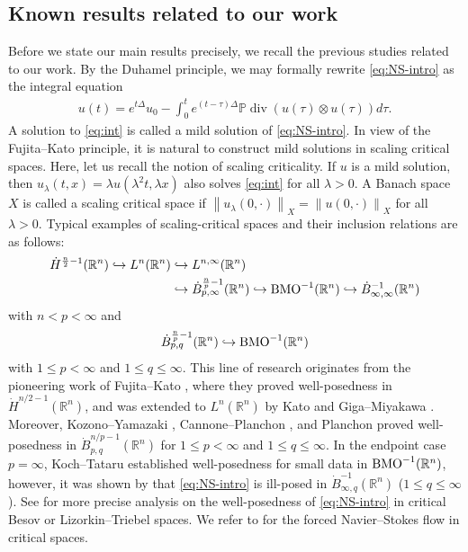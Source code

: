 \documentclass[a4paper,12pt,reqno]{amsart}
\theoremstyle{plain}
\theoremstyle{definition}
\renewcommand{\div}{\operatorname{div}}
\newcommand{\dB}{\dot{B}}
\renewcommand{\leq}{\leqslant}
\newcommand{\n}[1]{{\left\|#1\right\|}}
\newcommand{\R}{\mathbb{R}}
\begin{document}
\subsection{Known results related to our work}
Before we state our main results precisely, we recall the previous studies related to our work.
By the Duhamel principle, we may formally rewrite
\eqref{eq:NS-intro} as the integral equation
\begin{align}\label{eq:int}
    u(t)
    = 
    e^{t\Delta}u_0
    -
    \int_0^t 
    e^{(t-\tau)\Delta}
    \mathbb{P}\div(u(\tau)\otimes u(\tau))d\tau.
\end{align}
A solution to \eqref{eq:int} is called a mild solution of \eqref{eq:NS-intro}.
In view of the Fujita--Kato principle, 
it is natural to construct mild solutions in scaling critical spaces.
Here, let us recall the notion of scaling criticality. 
If $u$ is a mild solution, then  $u_\lambda(t,x)=\lambda u(\lambda^2 t,\lambda x)$
also solves \eqref{eq:int} for all $\lambda>0$. 
A Banach space $X$
is called a scaling critical space if $\n{u_{\lambda}(0,\cdot)}_X = \n{u(0,\cdot)}_X$ for all $\lambda>0$. 
Typical examples of scaling-critical spaces and their inclusion relations are as follows:
\begin{align}
    \dot{H}^{\frac{n}{2}-1}(\mathbb{R}^n)
    \hookrightarrow 
    L^n(\mathbb{R}^n)
    &
    \hookrightarrow 
    L^{n,\infty}(\mathbb{R}^n)
    \\
    &
    \hookrightarrow
    \dot{B}_{p,\infty}^{\frac{n}{p}-1}(\R^n)
    \hookrightarrow
    {\rm BMO}^{-1}(\R^n)
    \hookrightarrow
    \dB_{\infty,\infty}^{-1}(\R^n)
\end{align}
with $n<p<\infty$ and 
\begin{align}
    \dot{B}_{p,q}^{\frac{n}{p}-1}(\mathbb{R}^n)\hookrightarrow {\rm BMO}^{-1}(\mathbb{R}^n)
\end{align}
with $1\leq p<\infty$ and $1\leq q\leq\infty$.
This line of research originates from the pioneering work of Fujita--Kato \cite{Fuj-Kato-64-ARMA}, where they proved well-posedness
in $\dot{H}^{n/2-1}(\mathbb{R}^n)$, and was extended to $L^n(\mathbb{R}^n)$ by Kato \cite{Kato-84}
and Giga--Miyakawa \cite{Gig-Miy-85}.
Moreover, Kozono--Yamazaki \cite{Koz-Yam-94}, Cannone--Planchon \cite{Can-Pla-96}, and Planchon \cite{Pla-98}
proved well-posedness in
$\dot{B}_{p,q}^{n/p-1}(\mathbb{R}^n)$ for $1\leq p<\infty$ and $1\leq q\leq\infty$.
In the endpoint case $p=\infty$, Koch--Tataru \cite{Koh-Tat-01} established well-posedness for small data in
${\rm BMO}^{-1}(\mathbb{R}^n)$, however, it was shown by \cites{Bou-Pav-08,Yon-10,Wan-15} that \eqref{eq:NS-intro} is ill-posed in $\dot{B}_{\infty,q}^{-1}(\mathbb{R}^n)$ ($1 \leq q \leq \infty$).
See \cite{IN} for more precise analysis on the well-posedness of \eqref{eq:NS-intro} in critical Besov or Lizorkin--Triebel spaces.
We refer to \cites{Kozono-Shimizu-2018,Takeuchi-2025-SIMA,Yam-2000,arXiv:2509.21272v2} for the forced Navier--Stokes flow in critical spaces.
\end{document}
